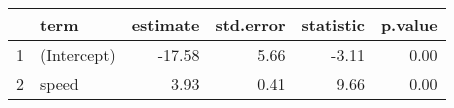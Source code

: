 \begin{tabular}{rlrrrr}
  \hline
 & term & estimate & std.error & statistic & p.value \\ 
  \hline
1 & (Intercept) & -17.58 & 5.66 & -3.11 & 0.00 \\ 
  2 & speed & 3.93 & 0.41 & 9.66 & 0.00 \\ 
   \hline
\end{tabular}
